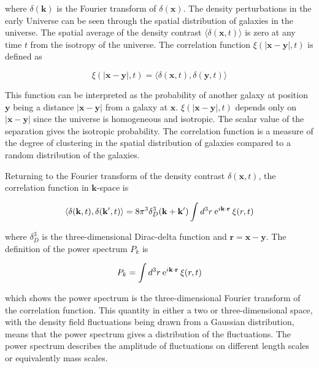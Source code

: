 \documentclass[twocolumn]{article}
\numberwithin{equation}{section}
\begin{document}
where $\delta(\mathbf{k})$ is the Fourier transform of $\delta(\mathbf{x})$. The density perturbations in the early 
Universe can be seen through the spatial distribution of galaxies in the universe. The spatial average of the density 
contrast $\langle \delta(\mathbf{x},t) \rangle$ is zero at any time $t$ from the isotropy of the universe. The correlation
function $\xi(|\mathbf{x} - \mathbf{y}|,t)$ is defined as

\begin{equation}
    \xi(|\mathbf{x} - \mathbf{y}|,t) = \langle \delta(\mathbf{x}, t), \delta(\mathbf{y},t) \rangle
\end{equation}

This function can be interpreted as the probability of another galaxy at position $\mathbf{y}$ being a distance $|\mathbf{x}
- \mathbf{y}|$ from a galaxy at $\mathbf{x}$. $\xi(|\mathbf{x} - \mathbf{y}|,t)$ depends only on $|\mathbf{x} - \mathbf{y}|$
since the universe is homogeneous and isotropic. The scalar value of the separation gives the isotropic probability. The 
correlation function is a measure of the degree of clustering in the spatial distribution of galaxies compared to a random
distribution of the galaxies.

Returning to the Fourier transform of the density contrast $\delta(\mathbf{x},t)$, the correlation function in 
$\mathbf{k}$-space is 

\begin{equation}
    \langle \delta(\mathbf{k},t), \delta(\mathbf{k}',t) \rangle = 8\pi^3 \delta^3_D(\mathbf{k} + \mathbf{k}') \int d^3 r 
    \: \textup{e}^{i\mathbf{k}\cdot\mathbf{r}} \: \xi(r,t)
\end{equation}

where $\delta_D^3$ is the three-dimensional Dirac-delta function and $\mathbf{r} = \mathbf{x}-\mathbf{y}$. The definition
of the power spectrum $P_k$ is 

\begin{equation}
    P_k = \int d^3 r \: \textup{e}^{i\mathbf{k}\cdot\mathbf{r}} \: \xi(r,t)
\end{equation}

which shows the power spectrum is the three-dimensional Fourier transform of the correlation function. This quantity in 
either a two or three-dimensional space, with the density field fluctuations being drawn from a Gaussian distribution, means
that the power spectrum gives a distribution of the fluctuations. The power spectrum describes the amplitude of fluctuations
on different length scales or equivalently mass scales.
\end{document}
